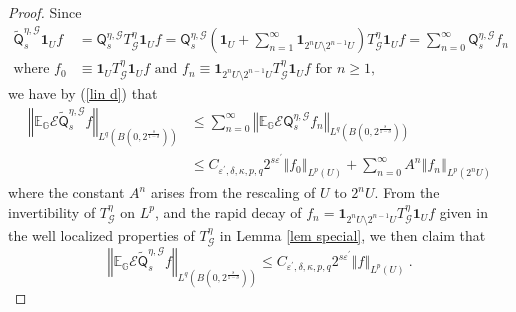 \documentclass[10pt,a4paper]{amsart}
\begin{document}
\begin{proof}
Since
\begin{align*}
\widetilde{\mathsf{Q}}_{s}^{\eta,\mathcal{G}}\mathbf{1}_{U}f  & =\mathsf{Q}%
_{s}^{\eta,\mathcal{G}}T_{\mathcal{G}}^{\eta}\mathbf{1}_{U}f=\mathsf{Q}%
_{s}^{\eta,\mathcal{G}}\left(  \mathbf{1}_{U}+\sum_{n=1}^{\infty}%
\mathbf{1}_{2^{n}U\setminus2^{n-1}U}\right)  T_{\mathcal{G}}^{\eta}%
\mathbf{1}_{U}f=\sum_{n=0}^{\infty}\mathsf{Q}_{s}^{\eta,\mathcal{G}}f_{n}\\
\text{where }f_{0}  & \equiv\mathbf{1}_{U}T_{\mathcal{G}}^{\eta}\mathbf{1}%
_{U}f\text{ and }f_{n}\equiv\mathbf{1}_{2^{n}U\setminus2^{n-1}U}%
T_{\mathcal{G}}^{\eta}\mathbf{1}_{U}f\text{ for }n\geq1,
\end{align*}
we have by (\ref{lin d}) that%
\begin{align*}
\left\Vert \mathbb{E}_{\mathbb{G}}\mathcal{E}\widetilde{\mathsf{Q}}_{s}%
^{\eta,\mathcal{G}}f\right\Vert _{L^{q}\left(  B\left(  0,2^{\frac{s}%
{1-\delta}}\right)  \right)  }  & \leq\sum_{n=0}^{\infty}\left\Vert
\mathbb{E}_{\mathbb{G}}\mathcal{E}\mathsf{Q}_{s}^{\eta,\mathcal{G}}%
f_{n}\right\Vert _{L^{q}\left(  B\left(  0,2^{\frac{s}{1-\delta}}\right)
\right)  }\\
& \leq C_{\varepsilon^{\prime},\delta,\kappa,p,q}2^{s\varepsilon^{\prime}%
}\left\Vert f_{0}\right\Vert _{L^{p}\left(  U\right)  }+\sum_{n=0}^{\infty
}A^{n}\left\Vert f_{n}\right\Vert _{L^{p}\left(  2^{n}U\right)  }%
\end{align*}
where the constant $A^{n}$ arises from the rescaling of $U$ to $2^{n}U$. From
the invertibility of $T_{\mathcal{G}}^{\eta}$ on $L^{p}$, and the rapid decay
of $f_{n}=\mathbf{1}_{2^{n}U\setminus2^{n-1}U}T_{\mathcal{G}}^{\eta}%
\mathbf{1}_{U}f$ given in the well localized properties of $T_{\mathcal{G}%
}^{\eta}$ in Lemma \ref{lem special}, we then claim that%
\[
\left\Vert \mathbb{E}_{\mathbb{G}}\mathcal{E}\widetilde{\mathsf{Q}}_{s}%
^{\eta,\mathcal{G}}f\right\Vert _{L^{q}\left(  B\left(  0,2^{\frac{s}%
{1-\delta}}\right)  \right)  }\leq C_{\varepsilon^{\prime},\delta,\kappa
,p,q}2^{s\varepsilon^{\prime}}\left\Vert f\right\Vert _{L^{p}\left(  U\right)
}\ .
\]



\end{proof}
\end{document}
